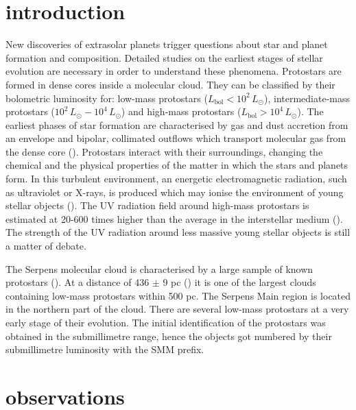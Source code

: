 \documentclass[a4paper]{article}
\begin{document}
\section*{\sc introduction}
\indent \indent New discoveries of extrasolar planets trigger questions about star and planet formation and composition. Detailed studies on the earliest stages of stellar evolution are necessary in order to understand these phenomena. Protostars are formed in dense cores inside a molecular cloud. They can be classified by their bolometric luminosity for: low-mass protostars ($L_{\mathrm{bol}} < 10^2 \, L{_\odot}$), intermediate-mass protostars ($10^2 \, L{_\odot} - 10^4 \, L{_\odot}$) and high-mass protostars ($L_{\mathrm{bol}} > 10^4 \, L{_\odot}$). The earliest phases of star formation are characterised by gas and dust accretion from an envelope and bipolar, collimated outflows which transport molecular gas from the dense core (\cite{arce2006}). Protostars interact with their surroundings, changing the chemical and the physical properties of the matter in which the stars and planets form. In this turbulent environment, an energetic electromagnetic radiation, such as ultraviolet or X-rays, is produced which may ionise the environment of young stellar objects (\cite{stauber2007}). The UV radiation field around high-mass protostars is estimated at 20-600 times higher than the average in the interstellar medium (\cite{benz2016}). The strength of the UV radiation around less massive young stellar objects is still a matter of debate. 

\indent \indent The Serpens molecular cloud is characterised by a large sample of known protostars (\cite{evans2009}). At a distance of 436 $\pm$ 9 pc (\cite{ortiz2017}) it is one of the largest clouds containing low-mass protostars within 500 pc. The Serpens Main region is located in the northern part of the cloud. There are several low-mass protostars at a very early stage of their evolution. The initial identification of the protostars was obtained in the submillimetre range, hence the objects got numbered by their submillimetre luminosity with the SMM prefix. 

\section*{\sc observations}
\end{document}
